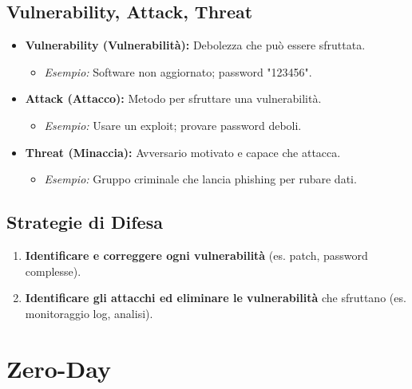 \subsection{Vulnerability, Attack, Threat}
\begin{itemize}
    \item \textbf{Vulnerability (Vulnerabilità):} Debolezza che può essere sfruttata.
        \begin{itemize}
            \item \textit{Esempio:} Software non aggiornato; password "123456".
        \end{itemize}
    \item \textbf{Attack (Attacco):} Metodo per sfruttare una vulnerabilità.
        \begin{itemize}
            \item \textit{Esempio:} Usare un exploit; provare password deboli.
        \end{itemize}
    \item \textbf{Threat (Minaccia):} Avversario motivato e capace che attacca.
        \begin{itemize}
            \item \textit{Esempio:} Gruppo criminale che lancia phishing per rubare dati.
        \end{itemize}
\end{itemize}

\subsection{Strategie di Difesa}
\begin{enumerate}
    \item \textbf{Identificare e correggere ogni vulnerabilità} (es. patch, password complesse).
    \item \textbf{Identificare gli attacchi ed eliminare le vulnerabilità} che sfruttano (es. monitoraggio log, analisi).
\end{enumerate}

\section{Zero-Day}

